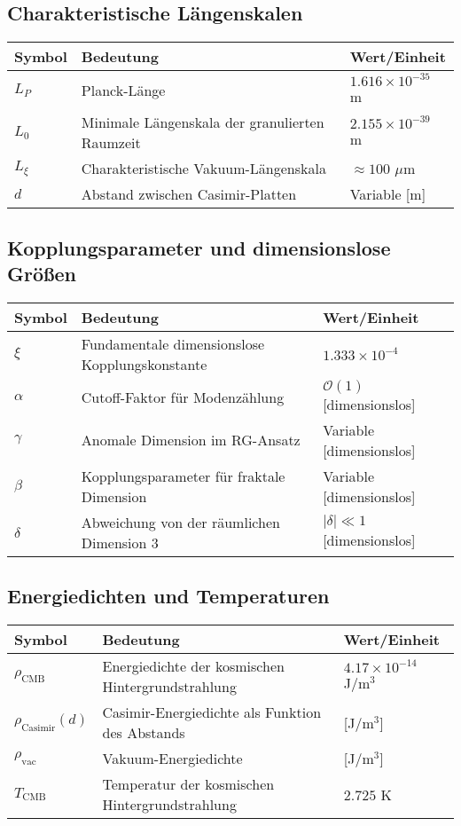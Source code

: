 \documentclass[12pt,a4paper]{article}
\begin{document}
	\subsection{Charakteristische Längenskalen}
	\begin{longtable}{p{2.5cm} p{10cm} p{3cm}}
		\toprule
		\textbf{Symbol} & \textbf{Bedeutung} & \textbf{Wert/Einheit} \\
		\midrule
		$L_P$ & Planck-Länge & $1.616 \times 10^{-35}$ m \\
		$L_0$ & Minimale Längenskala der granulierten Raumzeit & $2.155 \times 10^{-39}$ m \\
		$L_\xi$ & Charakteristische Vakuum-Längenskala & $\approx 100$ $\mu$m \\
		$d$ & Abstand zwischen Casimir-Platten & Variable [m] \\
		\bottomrule
	\end{longtable}
	
	\subsection{Kopplungsparameter und dimensionslose Größen}
	\begin{longtable}{p{2.5cm} p{10cm} p{3cm}}
		\toprule
		\textbf{Symbol} & \textbf{Bedeutung} & \textbf{Wert/Einheit} \\
		\midrule
		$\xi$ & Fundamentale dimensionslose Kopplungskonstante & $1.333 \times 10^{-4}$ \\
		$\alpha$ & Cutoff-Faktor für Modenzählung & $\mathcal{O}(1)$ [dimensionslos] \\
		$\gamma$ & Anomale Dimension im RG-Ansatz & Variable [dimensionslos] \\
		$\beta$ & Kopplungsparameter für fraktale Dimension & Variable [dimensionslos] \\
		$\delta$ & Abweichung von der räumlichen Dimension 3 & $|\delta| \ll 1$ [dimensionslos] \\
		\bottomrule
	\end{longtable}
	
	\subsection{Energiedichten und Temperaturen}
	\begin{longtable}{p{2.5cm} p{10cm} p{3cm}}
		\toprule
		\textbf{Symbol} & \textbf{Bedeutung} & \textbf{Wert/Einheit} \\
		\midrule
		$\rho_{\text{CMB}}$ & Energiedichte der kosmischen Hintergrundstrahlung & $4.17 \times 10^{-14}$ J/m$^3$ \\
		$\rho_{\text{Casimir}}(d)$ & Casimir-Energiedichte als Funktion des Abstands & [J/m$^3$] \\
		$\rho_{\text{vac}}$ & Vakuum-Energiedichte & [J/m$^3$] \\
		$T_{\text{CMB}}$ & Temperatur der kosmischen Hintergrundstrahlung & $2.725$ K \\
		\bottomrule
	\end{longtable}
	
\end{document}
